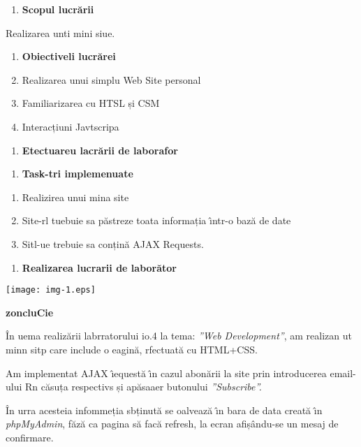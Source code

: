 \documentclass[12pt]{article}
\begin{document}
\begin{enumerate}
	\item \textbf{Scopul lucr\u{a}rii
\\
}
\end{enumerate}

{\raggedright
Realizarea unti mini siue.
}

\begin{enumerate}
	\item \textbf{Obiectiveli lucr\u{a}rei}
	\item Realizarea unui simplu Web Site personal
	\item Familiarizarea cu HTSL și CSM
	\item Interacțiuni Javtscripa
\end{enumerate}

\begin{enumerate}
	\item \textbf{Etectuareu lacr\u{a}rii de laborafor}
\end{enumerate}

\begin{enumerate}
	\item \textbf{Task-tri implemenuate }
\end{enumerate}

\begin{enumerate}
	\item Realizirea unui mina site
	\item Site-rl tuebuie sa p\u{a}streze toata informația \^{\i}ntr-o baz\u{a} de date
	\item Sitl-ue trebuie sa conțin\u{a} AJAX Requests.
\end{enumerate}

\begin{enumerate}
	\item \textbf{Realizarea lucrarii de labor\u{a}tor }
\end{enumerate}
\texttt{[image: img-1.eps]}
{\raggedright
\textbf{zoncluCie}
}

{\raggedright
{\small \^{I}n uema realiz\u{a}rii labrratorului io.4 la tema: \textit{''Web
Development''}, am realizan ut minn sitp care include o eagin\u{a}, rfectuat\u{a}
cu HTML+CSS.}
}

{\raggedright
{\small Am implementat AJAX \^{\i}equest\u{a} \^{\i}n cazul abon\u{a}rii la site
prin introducerea email-ului Rn c\u{a}suța respectivs și ap\u{a}saaer butonului
\textit{''Subscribe''.} }
}

{\raggedright
{\small \^{I}n urra acesteia infommeția sbținut\u{a} se oalveaz\u{a} \^{\i}n
bara de data creat\u{a} \^{\i}n \textit{phpMyAdmin}, f\u{a}z\u{a} ca pagina
s\u{a} fac\u{a} refresh, la ecran afiș\^{a}ndu-se un mesaj de confirmare.}
}
\end{document}
